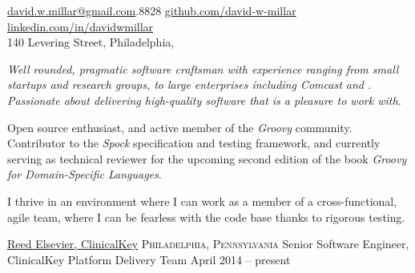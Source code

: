 \documentclass[10pt,a4paper]{article}
\begin{document}
\sloppy


\nobreakvspace{0.3em}  %
\noindent\href{mailto:david.w.millar.at.gmail.com}{david.w.millar\mbox{}@\mbox{}gmail.com}\hspace{1.7mm}.8828
\sbull
\href{http://www.github.com/david-w-millar}{github.com/david-w-millar}\sbull
\href{http://www.linkedin.com/in/davidwmillar}{linkedin.com/in/davidwmillar}
\\
140 Levering Street, Philadelphia,

\spacedhrule{0.9em}{-0.4em}


\vspace{-1.3em}  %
\begin{multicols}{2}  %
  \emph{
    Well rounded, pragmatic software craftsman with experience ranging from small startups and research groups, to large enterprises including Comcast and .
    Passionate about delivering high-quality software that is a pleasure to work with.
  }

Open source enthusiast, and active member of the \emph{Groovy} community.
Contributor to the \emph{Spock} specification and testing framework, and currently serving as technical reviewer for the upcoming second edition of the book \emph{Groovy for Domain-Specific Languages}.

I thrive in an environment where I can work as a member of a cross-functional, agile team, where I can be fearless with the code base thanks to rigorous testing.

\end{multicols}


\spacedhrule{0em}{-0.4em}


\headedsection
{\href{http://www.elsevier.com/}{Reed Elsevier, ClinicalKey}}
  {\textsc{Philadelphia, Pennsylvania}} {%
  \headedsubsection
    {Senior Software Engineer, ClinicalKey Platform Delivery Team}
    {April 2014 -- present}
    {}
}
\end{document}
